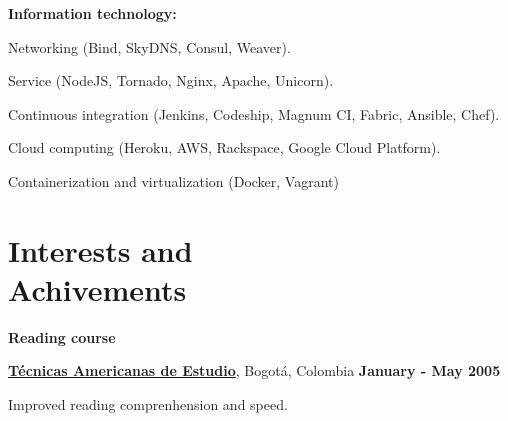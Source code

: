 \halfblankline

\textbf{Information technology:} 
    \begin{innerlist}
\item Networking (Bind, SkyDNS, Consul, Weaver).
\item Service (NodeJS, Tornado, Nginx, Apache, Unicorn).
\item Continuous integration (Jenkins, Codeship, Magnum CI,
Fabric, Ansible, Chef).
\item Cloud computing (Heroku, AWS, Rackspace, Google Cloud Platform).
\item Containerization and virtualization (Docker, Vagrant)
    \end{innerlist}

% 
% 
% 


%
% 
% 

% 

\section{Interests and \\ Achivements}
%
\textbf{Reading course}
\begin{outerlist}

\item[] \href{http://www.tecnicasamericanas.com/}{\textbf{T\'ecnicas Americanas
de Estudio}}, Bogot\'a, Colombia%
        \hfill \textbf{January - May 2005}
\begin{innerlist}
\item Improved reading comprenhension and speed.
\end{innerlist}
\end{outerlist}

